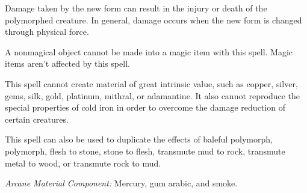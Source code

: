 {	Damage taken by the new form can result in the injury or death of the polymorphed creature. In general, damage occurs when the new form is changed through physical force.

	A nonmagical object cannot be made into a magic item with this spell. Magic items aren't affected by this spell.

	This spell cannot create material of great intrinsic value, such as copper, silver, gems, silk, gold, platinum, mithral, or adamantine. It also cannot reproduce the special properties of cold iron in order to overcome the damage reduction of certain creatures.

	This spell can also be used to duplicate the effects of baleful polymorph, polymorph, flesh to stone, stone to flesh, transmute mud to rock, transmute metal to wood, or transmute rock to mud.

	\textit{Arcane Material Component:}
	Mercury, gum arabic, and smoke.

}
